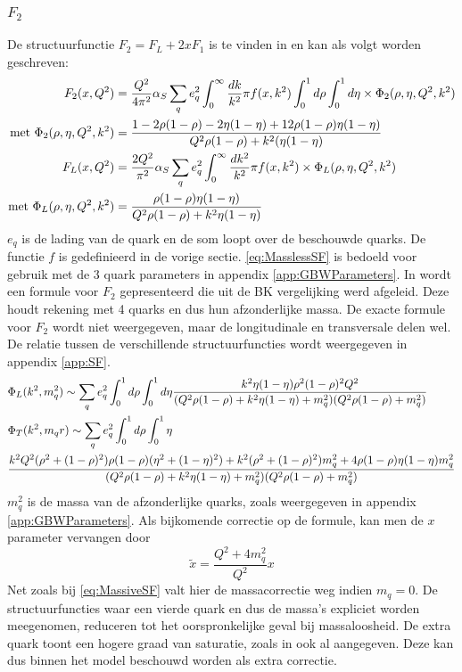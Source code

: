 \documentclass[a4paper,11pt]{article}
\numberwithin{equation}{section} %
\begin{document}
    \subsubsection{$F_2$} \label{sec:SF}
De structuurfunctie $F_2 = F_L + 2x F_1$ is te vinden in \cite[vgl. 9.200]{Barone} en kan als volgt worden geschreven:
\begin{align} \label{eq:MasslessSF}
F_2(x,Q^2) &= \frac{Q^2}{4\pi^2} \alpha_S \sum_q e_q^2 \int_0^\infty \frac{dk}{k^2}\pi f(x,k^2) \int_0^1 d\rho \int_0^1 d\eta \times \Phi_2(\rho, \eta, Q^2, k^2) \\
\text{met } \Phi_2(\rho, \eta, Q^2, k^2) &= \frac{1-2\rho(1-\rho)-2\eta(1-\eta)+12\rho(1-\rho)\eta(1-\eta)}{Q^2 \rho(1-\rho) + k^2 (\eta(1-\eta)}\notag \\
F_L(x,Q^2) &= \frac{2 Q^2}{\pi^2} \alpha_S \sum_q e_q^2 \int_0^\infty \frac{dk^2}{k^2} \pi f(x,k^2) \times \Phi_L(\rho, \eta, Q^2, k^2) \\
\text{met } \Phi_L(\rho, \eta, Q^2, k^2) &= \frac{\rho(1-\rho)\eta(1-\eta)}{Q^2 \rho(1-\rho)+k^2 \eta(1-\eta)} \notag
\end{align}
$e_q$ is de lading van de quark en de som loopt over de beschouwde quarks.
De functie $f$ is gedefinieerd in de vorige sectie.
\eqref{eq:MasslessSF} is bedoeld voor gebruik met de 3 quark parameters in appendix \ref{app:GBWParameters}.
In \cite{Bondarenko} wordt een formule voor $F_2$ gepresenteerd die uit de BK vergelijking werd afgeleid.
Deze houdt rekening met 4 quarks en dus hun afzonderlijke massa.
De exacte formule voor $F_2$ wordt niet weergegeven, maar de longitudinale en transversale delen wel.
De relatie tussen de verschillende structuurfuncties wordt weergegeven in appendix \ref{app:SF}.
\begin{align} \label{eq:MassiveSF}
&\Phi_L(k^2, m_q^2) \sim \sum_q e_q^2 \int_0^1 d\rho \int_0^1 d\eta \frac{k^2 \eta(1-\eta)\rho^2(1-\rho)^2 Q^2}{(Q^2\rho(1-\rho)+k^2\eta(1-\eta)+m_q^2)(Q^2\rho(1-\rho)+m_q^2)} \\
&\Phi_T(k^2, m_q^^2) \sim \sum_q e_q^2 \int_0^1 d\rho \int_0^1 \eta \notag \\
&\frac{k^2 Q^2 (\rho^2+(1-\rho)^2)\rho(1-\rho)(\eta^2+(1-\eta)^2)+k^2(\rho^2+(1-\rho)^2)m_q^2 + 4\rho(1-\rho)\eta(1-\eta)m_q^2}{(Q^2\rho(1-\rho)+k^2\eta(1-\eta)+m_q^2)(Q^2\rho(1-\rho)+m_q^2)}
\end{align}
$m_q^2$ is de massa van de afzonderlijke quarks, zoals weergegeven in appendix \ref{app:GBWParameters}.
Als bijkomende correctie op de formule, kan men de $x$ parameter vervangen door
\begin{equation}
\tilde{x} = \frac{Q^2+ 4 m_q^2}{Q^2} x 
\end{equation}
Net zoals bij \ref{eq:MassiveSF} valt hier de massacorrectie weg indien $m_q=0$.
De structuurfuncties waar een vierde quark en dus de massa’s expliciet worden meegenomen, reduceren tot het oorspronkelijke geval bij massaloosheid.
De extra quark toont een hogere graad van saturatie, zoals in \cite{GBW} ook al aangegeven.
Deze kan dus binnen het model beschouwd worden als extra correctie.
\end{document}
